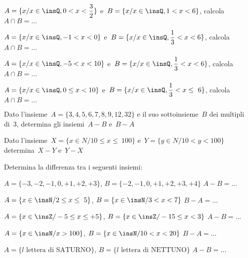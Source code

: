 \begin{esercizio}
\label{ese:7.48}
$A=\{x/x\in \insQ,0<x<\dfrac{3}{2}\}$ e~$B=\{x/x\in \insQ,1<x<6\}$, 
calcola~$A\cap B=\ldots$
\end{esercizio}

\begin{esercizio}
\label{ese:7.49}
$A=\{x/x\in \insQ,-1<x<0\}$ e~$B=\{x/x\in \insQ,\dfrac{1}{3}<x<6\}$, 
calcola~$A\cap B=\ldots$
\end{esercizio}

\begin{esercizio}
\label{ese:7.50}
$A=\{x/x\in \insQ,-5<x<10\}$ e~$B=\{x/x\in \insQ,\dfrac{1}{3}<x<6\}$, 
calcola~$A\cap B=\ldots$
\end{esercizio}

\begin{esercizio}
\label{ese:7.51}
$A=\{x/x\in \insQ,0\le x<10\}$ e~$B=\{x/x\in \insQ,\dfrac{1}{3}<x\le~6\}$, 
calcola~$A\cap B=\ldots$
\end{esercizio}

\begin{esercizio}
\label{ese:7.52}
Dato l'insieme~$A=\{3, 4, 5, 6, 7, 8, 9, 12, 32\}$ e il suo sottoinsieme~$B$ dei 
multipli di~3, determina gli
insiemi~$A-B$ e~$B-A$
\end{esercizio}

\begin{esercizio}
\label{ese:7.53}
Dato l'insieme~$X=\{x\in N/10\le x\le~100\}$ e~$Y=\{y\in N/10<y<100\}$ 
determina~$X-Y$ e~$Y-X$
\end{esercizio}

\begin{esercizio}
\label{ese:7.54}
Determina la differenza tra i seguenti insiemi:

\begin{enumeratea}
 \item $A=\{-3,-2,-1,0,+1,+2,+3\}$, $B=\{-2,-1,0,+1,+2,+3,+4\}$ $A-B=\ldots$
\item $A=\{x\in\insN/2\le x\le~5\}$, $B=\{x\in\insN/3<x<7\}$ $B-A=\ldots$
\item $A=\{x\in\insZ/-5\le x\le +5\}$, $B=\{x\in\insZ/-15\le x<3\}$ $A-B=\ldots$
\item $A=\{x\in\insN/x>100\}$, $B=\{x\in \insN/10<x<20\}$ $B-A=\ldots$
\item $A=\{l\text{ lettera di SATURNO}\}$, $B=\{l\text{ lettera di NETTUNO}\}$ 
$A-B=\ldots$
\end{enumeratea}
\end{esercizio}

